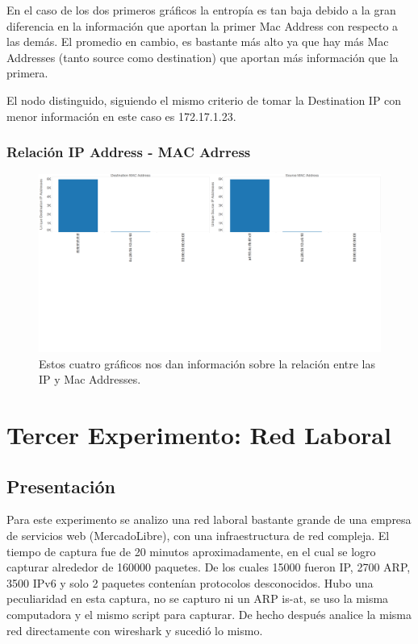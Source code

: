 \documentclass{article}
\theoremstyle{definition}
\theoremstyle{remark}
\begin{document}
En el caso de los dos primeros gráficos la entropía es tan baja debido a la gran diferencia en la información que aportan la primer Mac Address con respecto a las demás. El promedio en cambio, es bastante más alto ya que hay más Mac Addresses (tanto source como destination) que aportan más información que la primera.


El nodo distinguido, siguiendo el mismo criterio de tomar la Destination IP con menor información en este caso es 172.17.1.23.

\subsubsection{Relación IP Address - MAC Adrress}
\begin{figure}[H]
    \centering
    \includegraphics[width=1\textwidth]{captures/McDonalds/20min/IP vs MAC Correspondence.png}
    \caption{Estos cuatro gráficos nos dan información sobre la relación entre las IP y Mac Addresses.}
    \label{fig:mesh1}
\end{figure}


\newpage

\section{Tercer Experimento: Red Laboral}

\subsection{Presentación}
Para este experimento se analizo una red laboral bastante grande de una empresa de servicios web (MercadoLibre), con una infraestructura de red compleja. 
El tiempo de captura fue de 20 minutos aproximadamente, en el cual se logro capturar alrededor de 160000 paquetes. De los cuales 15000 fueron IP, 2700 ARP, 3500 IPv6 y solo 2 paquetes contenían protocolos desconocidos.
Hubo una peculiaridad en esta captura, no se capturo ni un ARP is-at, se uso la misma computadora y el mismo script para capturar. De hecho después analice la misma red directamente con wireshark y sucedió lo mismo.
\end{document}
